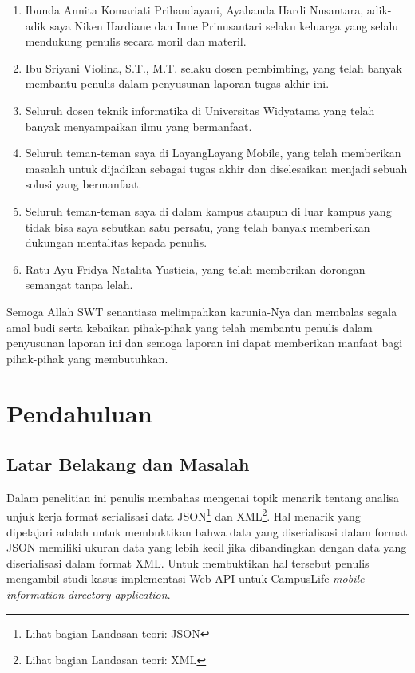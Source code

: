 \documentclass[a4paper, 12pt, oneside]{report}
\begin{document}
\begin{enumerate}
  \item Ibunda Annita Komariati Prihandayani, Ayahanda Hardi Nusantara, adik-adik saya Niken Hardiane dan Inne Prinusantari selaku keluarga yang selalu mendukung penulis secara moril dan materil.
  \item Ibu Sriyani Violina, S.T., M.T. selaku dosen pembimbing, yang telah banyak membantu penulis dalam penyusunan laporan tugas akhir ini.
  \item Seluruh dosen teknik informatika di Universitas Widyatama yang telah banyak menyampaikan ilmu yang bermanfaat.
  \item Seluruh teman-teman saya di LayangLayang Mobile, yang telah memberikan masalah untuk dijadikan sebagai tugas akhir dan diselesaikan menjadi sebuah solusi yang bermanfaat.
  \item Seluruh teman-teman saya di dalam kampus ataupun di luar kampus yang
tidak bisa saya sebutkan satu persatu, yang telah banyak memberikan dukungan mentalitas kepada penulis.
  \item Ratu Ayu Fridya Natalita Yusticia, yang telah memberikan dorongan semangat tanpa lelah.
\end{enumerate}

\onehalfspacing Semoga Allah SWT senantiasa melimpahkan karunia-Nya dan membalas segala amal budi serta kebaikan pihak-pihak yang telah membantu penulis dalam penyusunan laporan ini dan semoga laporan ini dapat memberikan manfaat bagi pihak-pihak yang membutuhkan.

\onehalfspacing
{}
\tableofcontents
\setcounter{secnumdepth}{5}
\setcounter{tocdepth}{7}

\listoffigures

\listoftables

\chapter{Pendahuluan} \label{bab:1}
\section{Latar Belakang dan Masalah}
\onehalfspacing Dalam penelitian ini penulis membahas mengenai topik menarik tentang analisa unjuk kerja format serialisasi data JSON\footnote{Lihat bagian Landasan teori: JSON} dan XML\footnote{Lihat bagian Landasan teori: XML}. Hal menarik yang dipelajari adalah untuk membuktikan bahwa data yang diserialisasi dalam format JSON memiliki ukuran data yang lebih kecil jika dibandingkan dengan data yang diserialisasi dalam format XML. Untuk membuktikan hal tersebut penulis mengambil studi kasus implementasi Web API untuk CampusLife \textit{mobile information directory application}.
\end{document}
